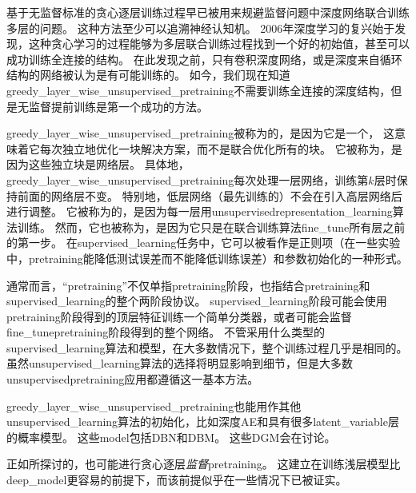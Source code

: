 基于无监督标准的贪心逐层训练过程早已被用来规避监督问题中深度网络联合训练多层的问题。
这种方法至少可以追溯神经认知机\citep{Fukushima75}。
2006年深度学习的复兴始于发现，这种贪心学习的过程能够为多层联合训练过程找到一个好的初始值，甚至可以成功训练全连接的结构\citep{Hinton06-small,Hinton-Science2006,HintonG2006,Bengio-nips-2006,ranzato-07-small}。
在此发现之前，只有卷积深度网络，或是深度来自循环结构的网络被认为是有可能训练的。
如今，我们现在知道\gls{greedy_layer_wise_unsupervised_pretraining}不需要训练全连接的深度结构，但是无监督提前训练是第一个成功的方法。


\gls{greedy_layer_wise_unsupervised_pretraining}被称为的，是因为它是一个，
这意味着它每次独立地优化一块解决方案，而不是联合优化所有的块。
它被称为，是因为这些独立块是网络层。
具体地，\gls{greedy_layer_wise_unsupervised_pretraining}每次处理一层网络，训练第$k$层时保持前面的网络层不变。
特别地，低层网络（最先训练的）不会在引入高层网络后进行调整。
它被称为的，是因为每一层用\gls{unsupervised}\gls{representation_learning}算法训练。
然而，它也被称为，是因为它只是在联合训练算法\gls{fine_tune}所有层之前的第一步。
在\gls{supervised_learning}任务中，它可以被看作是正则项（在一些实验中，\gls{pretraining}能降低测试误差而不能降低训练误差）和参数初始化的一种形式。


通常而言，``\gls{pretraining}''不仅单指\gls{pretraining}阶段，也指结合\gls{pretraining}和\gls{supervised_learning}的整个两阶段协议。
\gls{supervised_learning}阶段可能会使用\gls{pretraining}阶段得到的顶层特征训练一个简单分类器，或者可能会监督\gls{fine_tune}\gls{pretraining}阶段得到的整个网络。
不管采用什么类型的\gls{supervised_learning}算法和模型，在大多数情况下，整个训练过程几乎是相同的。
虽然\gls{unsupervised_learning}算法的选择将明显影响到细节，但是大多数\gls{unsupervised}\gls{pretraining}应用都遵循这一基本方法。


\gls{greedy_layer_wise_unsupervised_pretraining}也能用作其他\gls{unsupervised_learning}算法的初始化，比如深度\gls{AE}\citep{Hinton-Science2006}和具有很多\gls{latent_variable}层的概率模型。
这些\gls{model}包括\gls{DBN}\citep{Hinton06-small}和\gls{DBM}\citep{Salakhutdinov+Hinton-2009-small}。
这些\gls{DGM}会在讨论。


正如所探讨的，也可能进行贪心逐层\emph{监督}\gls{pretraining}。
这建立在训练浅层模型比\gls{deep_model}更容易的前提下，而该前提似乎在一些情况下已被证实\citep{Erhan+al-2010-small}。



